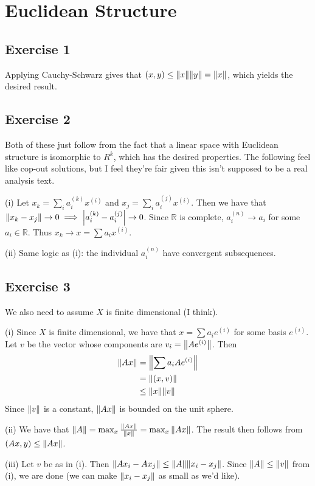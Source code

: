 \section{Euclidean Structure}

\subsection{Exercise 1}
Applying Cauchy-Schwarz gives that $(x, y) \leq \norm{x}\norm{y} = \norm{x}$, which yields
the desired result.

\subsection{Exercise 2}
Both of these just follow from the fact that a linear space with Euclidean structure is
isomorphic to $R^k$, which has the desired properties. The following feel like cop-out
solutions, but I feel they're fair given this isn't supposed to be a real analysis text.

(i) Let $x_k = \sum_i a_i^{(k)} x^{(i)}$ and $x_j = \sum_i a_i^{(j)} x^{(i)}$. Then we have that
$\norm{x_k - x_j} \to 0 \implies \abs{a_i^{(k)} - a_i^{(j)}} \to 0$. Since $\mathbb{R}$ is
complete, $a_i^{(n)} \to a_i$ for some $a_i \in \mathbb{R}$. Thus $x_k \to x = \sum a_i x^{(i)}$.

(ii) Same logic as (i): the individual $a_i^{(n)}$ have convergent subsequences.

\subsection{Exercise 3}
We also need to assume $X$ is finite dimensional (I think).

(i) Since $X$ is finite dimensional, we have that $x = \sum a_i e^{(i)}$ for some basis $e^{(i)}$. Let
$v$ be the vector whose components are $v_i = \norm{Ae^{(i)}}$. Then
\begin{align*}
        \norm{Ax} &= \norm{\sum a_i Ae^{(i)}} \\
                  &= \norm{(x, v)} \\
                  &\leq \norm{x} \norm{v}
\end{align*}
Since $\norm{v}$ is a constant, $\norm{Ax}$ is bounded on the unit sphere.

(ii) We have that $\norm{A} = \max_x \frac{\norm{Ax}}{\norm{x}} = \max_x \norm{Ax}$.
 The result then follows from $(Ax, y) \leq \norm{Ax}$.

(iii) Let $v$ be as in (i). Then $\norm{Ax_i - Ax_j} \leq \norm{A} \norm{x_i - x_j}$. Since
$\norm{A} \leq \norm{v}$ from (i), we are done (we can make $ \norm{x_i - x_j}$ as small
as we'd like).

